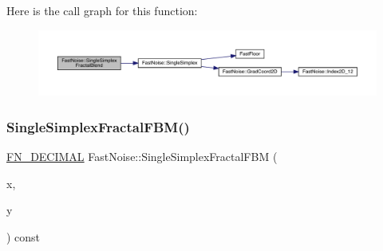 Here is the call graph for this function\+:
\nopagebreak
\begin{figure}[H]
\begin{center}
\leavevmode
\includegraphics[width=350pt]{class_fast_noise_af076ea4b492ce8e166816c5842ce43da_cgraph}
\end{center}
\end{figure}
\mbox{\label{class_fast_noise_af7e3a4be65f1e27d1af76111a382adbc}} 
\subsubsection{\texorpdfstring{Single\+Simplex\+Fractal\+F\+B\+M()}{SingleSimplexFractalFBM()}\hspace{0.1cm}{\footnotesize\ttfamily [1/2]}}
{\footnotesize\ttfamily \mbox{\hyperlink{_fast_noise_8h_a75a9ef6d2541c4921815b885bfd449c3}{F\+N\+\_\+\+D\+E\+C\+I\+M\+AL}} Fast\+Noise\+::\+Single\+Simplex\+Fractal\+F\+BM (\begin{DoxyParamCaption}\item[{\mbox{\hyperlink{_fast_noise_8h_a75a9ef6d2541c4921815b885bfd449c3}{F\+N\+\_\+\+D\+E\+C\+I\+M\+AL}}}]{x,  }\item[{\mbox{\hyperlink{_fast_noise_8h_a75a9ef6d2541c4921815b885bfd449c3}{F\+N\+\_\+\+D\+E\+C\+I\+M\+AL}}}]{y }\end{DoxyParamCaption}) const\hspace{0.3cm}{\ttfamily [private]}}

